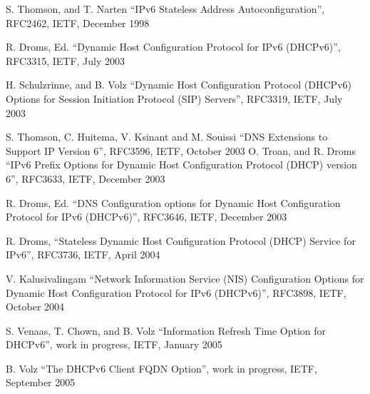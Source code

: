 \begin{thebibliography}{1}

 S. Thomson, and T. Narten ``IPv6 Stateless Address
  Autoconfiguration'', RFC2462, IETF, December 1998

 R. Droms, Ed. ``Dynamic Host Configuration Protocol
  for IPv6 (DHCPv6)'', RFC3315, IETF, July 2003

 H. Schulzrinne, and B. Volz ``Dynamic Host
  Configuration Protocol (DHCPv6) Options for Session Initiation
  Protocol (SIP) Servers'', RFC3319, IETF, July 2003

 S. Thomson, C. Huitema, V. Ksinant and M. Souissi
  ``DNS Extensions to Support IP Version 6'', RFC3596, IETF, October
  2003
 O. Troan, and R. Droms ``IPv6 Prefix Options for
  Dynamic Host Configuration Protocol (DHCP) version 6'', RFC3633,
  IETF, December 2003

 R. Droms, Ed. ``DNS Configuration options for
  Dynamic Host Configuration Protocol for IPv6 (DHCPv6)'', RFC3646,
  IETF, December 2003

 R. Droms, ``Stateless Dynamic Host Configuration
  Protocol (DHCP) Service for IPv6'', RFC3736, IETF, April 2004

 V. Kalusivalingam ``Network Information Service
  (NIS) Configuration Options for Dynamic Host Configuration Protocol
  for IPv6 (DHCPv6)'', RFC3898, IETF, October 2004

 S. Venaas, T. Chown, and B. Volz
  ``Information Refresh Time Option for DHCPv6'', work in
  progress, IETF, January 2005

 B. Volz
  ``The DHCPv6 Client FQDN Option'', work in
  progress, IETF, September 2005

\end{thebibliography}
